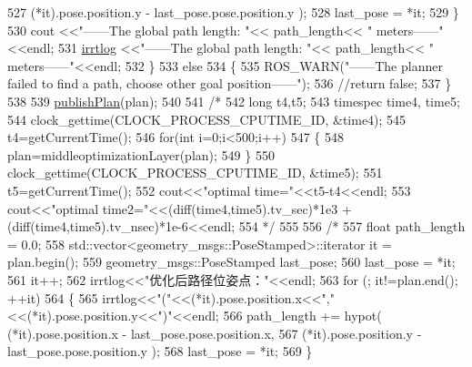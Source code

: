 \begin{DoxyCode}
{{{527                                    (*it).pose.position.y - last\_pose.pose.position.y );
528             last\_pose = *it;
529         \}
530         cout <<\textcolor{stringliteral}{"------The global path length: "}<< path\_length<< \textcolor{stringliteral}{" meters------"}<<endl;
531         \hyperlink{rrt__planner_8cpp_ae63d6003ff9416f7c0be6892e5bb899c}{irrtlog} <<\textcolor{stringliteral}{"------The global path length: "}<< path\_length<< \textcolor{stringliteral}{" meters------"}<<endl;
532     \}
533     \textcolor{keywordflow}{else}
534     \{
535         ROS\_WARN(\textcolor{stringliteral}{"------The planner failed to find a path, choose other goal position------"});
536         \textcolor{comment}{//return false;}
537     \}
538 
539     \hyperlink{classrrt__plan_1_1rrt__planner_ac2fe5313cbc77dffddfcfe1f6605d53e}{publishPlan}(plan);
540     
541      \textcolor{comment}{/*}
542 \textcolor{comment}{     long t4,t5;}
543 \textcolor{comment}{     timespec time4, time5;}
544 \textcolor{comment}{     clock\_gettime(CLOCK\_PROCESS\_CPUTIME\_ID, &time4);}
545 \textcolor{comment}{     t4=getCurrentTime();}
546 \textcolor{comment}{     for(int i=0;i<500;i++)}
547 \textcolor{comment}{     \{}
548 \textcolor{comment}{         plan=middleoptimizationLayer(plan);}
549 \textcolor{comment}{     \}}
550 \textcolor{comment}{     clock\_gettime(CLOCK\_PROCESS\_CPUTIME\_ID, &time5);}
551 \textcolor{comment}{     t5=getCurrentTime();}
552 \textcolor{comment}{     cout<<"optimal time="<<t5-t4<<endl;}
553 \textcolor{comment}{     cout<<"optimal time2="<<(diff(time4,time5).tv\_sec)*1e3 + (diff(time4,time5).tv\_nsec)*1e-6<<endl;}
554 \textcolor{comment}{     */}
555      
556      \textcolor{comment}{/*}
557 \textcolor{comment}{     float path\_length = 0.0;}
558 \textcolor{comment}{     std::vector<geometry\_msgs::PoseStamped>::iterator it = plan.begin();}
559 \textcolor{comment}{     geometry\_msgs::PoseStamped last\_pose;}
560 \textcolor{comment}{     last\_pose = *it;}
561 \textcolor{comment}{     it++;}
562 \textcolor{comment}{     irrtlog<<"优化后路径位姿点："<<endl;}
563 \textcolor{comment}{     for (; it!=plan.end(); ++it)}
564 \textcolor{comment}{     \{}
565 \textcolor{comment}{            irrtlog<<"("<<(*it).pose.position.x<<","<<(*it).pose.position.y<<")"<<endl;}
566 \textcolor{comment}{            path\_length += hypot(  (*it).pose.position.x - last\_pose.pose.position.x,}
567 \textcolor{comment}{                                   (*it).pose.position.y - last\_pose.pose.position.y );}
568 \textcolor{comment}{            last\_pose = *it;}
569 \textcolor{comment}{     \}}
}}}
\end{DoxyCode}
